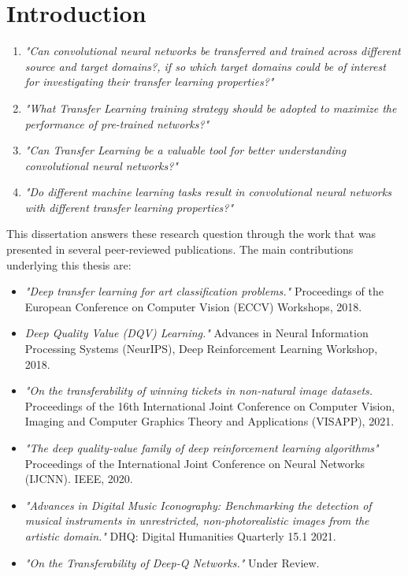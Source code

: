 \chapter*{Introduction}
\label{ch:introduction}


\begin{enumerate}
	\item \textit{"Can convolutional neural networks be transferred and trained across different source and target domains?, if so which target domains could be of interest for investigating their transfer learning properties?"}
		
	\item \textit{"What Transfer Learning training strategy should be adopted to maximize the performance of pre-trained networks?"}

	\item \textit{"Can Transfer Learning be a valuable tool for better understanding convolutional neural networks?"}
	
	\item \textit{"Do different machine learning tasks result in convolutional neural networks with different transfer learning properties?"}
\end{enumerate}


This dissertation answers these research question through the work that was presented in several peer-reviewed publications. The main contributions underlying this thesis are:

\begin{itemize}
	\item \citet{sabatelli2018deep} \textit{"Deep transfer learning for art classification problems."} Proceedings of the European Conference on Computer Vision (ECCV) Workshops, 2018.
	\item \citet{sabatelli2018deepqv} \textit{Deep Quality Value (DQV) Learning."} Advances in Neural Information Processing Systems (NeurIPS), Deep Reinforcement Learning Workshop, 2018.
\item \citet{sabatelli2020transferability} \textit{"On the transferability of winning tickets in non-natural image datasets.} Proceedings of the 16th International Joint Conference on Computer Vision, Imaging and Computer Graphics Theory and Applications (VISAPP), 2021.
	\item \citet{sabatelli2020deep} \textit{"The deep quality-value family of deep reinforcement learning algorithms"} Proceedings of the International Joint Conference on Neural Networks (IJCNN). IEEE, 2020.
	\item \citet{sabatelli2021advances} \textit{"Advances in Digital Music Iconography: Benchmarking the detection of musical instruments in unrestricted, non-photorealistic images from the artistic domain."} DHQ: Digital Humanities Quarterly 15.1 2021.
	\item \textit{"On the Transferability of Deep-Q Networks."} Under Review. 
\end{itemize}

